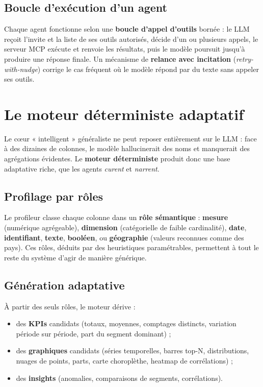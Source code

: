 \subsection{Boucle d'exécution d'un agent}
Chaque agent fonctionne selon une \textbf{boucle d'appel d'outils} bornée :
le LLM reçoit l'invite et la liste de ses outils autorisés, décide d'un ou
plusieurs appels, le serveur MCP exécute et renvoie les résultats, puis le
modèle poursuit jusqu'à produire une réponse finale. Un mécanisme de
\textbf{relance avec incitation} (\textit{retry-with-nudge}) corrige le cas
fréquent où le modèle répond par du texte sans appeler ses outils.

\section{Le moteur déterministe adaptatif}
Le cœur « intelligent » généraliste ne peut reposer entièrement sur le LLM :
face à des dizaines de colonnes, le modèle hallucinerait des noms et
manquerait des agrégations évidentes. Le \textbf{moteur déterministe} produit
donc une base adaptative riche, que les agents \emph{curent} et \emph{narrent}.

\subsection{Profilage par rôles}
Le profileur classe chaque colonne dans un \textbf{rôle sémantique} :
\textbf{mesure} (numérique agrégeable), \textbf{dimension} (catégorielle de
faible cardinalité), \textbf{date}, \textbf{identifiant}, \textbf{texte},
\textbf{booléen}, ou \textbf{géographie} (valeurs reconnues comme des pays).
Ces rôles, déduits par des heuristiques paramétrables, permettent à tout le
reste du système d'agir de manière générique.

\subsection{Génération adaptative}
À partir des seuls rôles, le moteur dérive :
\begin{itemize}
  \item des \textbf{KPIs} candidats (totaux, moyennes, comptages distincts,
        variation période sur période, part du segment dominant) ;
  \item des \textbf{graphiques} candidats (séries temporelles, barres top-N,
        distributions, nuages de points, parts, carte choroplèthe, heatmap de
        corrélations) ;
  \item des \textbf{insights} (anomalies, comparaisons de segments,
        corrélations).
\end{itemize}

